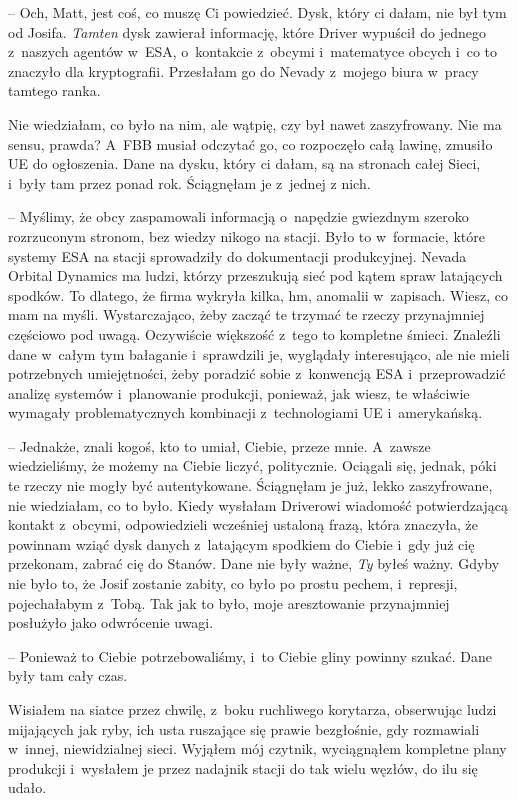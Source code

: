 \documentclass[oneside,polish,12pt,sfheadings]{mwbk}
\begin{document}
-- Och, Matt, jest coś, co muszę Ci powiedzieć. Dysk, który ci dałam, nie
był tym od Josifa. \emph{Tamten} dysk zawierał informację, które Driver
wypuścił do jednego z~naszych agentów w~ESA, o~kontakcie z~obcymi i~matematyce obcych i~co to znaczyło dla kryptografii. Przesłałam go do
Nevady z~mojego biura w~pracy tamtego ranka.

Nie wiedziałam, co było na nim, ale wątpię, czy był nawet zaszyfrowany.
Nie ma sensu, prawda? A~FBB musiał odczytać go, co rozpoczęło całą
lawinę, zmusiło UE do ogłoszenia. Dane na dysku, który ci dałam, są na
stronach całej Sieci, i~były tam przez ponad rok. Ściągnęłam je z~jednej
z nich.

-- Myślimy, że obcy zaspamowali informacją o~napędzie gwiezdnym szeroko
rozrzuconym stronom, bez wiedzy nikogo na stacji. Było to w~formacie,
które systemy ESA na stacji sprowadziły do dokumentacji produkcyjnej.
Nevada Orbital Dynamics ma ludzi, którzy przeszukują sieć pod kątem
spraw latających spodków. To dlatego, że firma wykryła kilka, hm,
anomalii w~zapisach. Wiesz, co mam na myśli. Wystarczająco, żeby zacząć
te trzymać te rzeczy przynajmniej częściowo pod uwagą. Oczywiście
większość z~tego to kompletne śmieci. Znaleźli dane w~całym tym
bałaganie i~sprawdzili je, wyglądały interesująco, ale nie mieli
potrzebnych umiejętności, żeby poradzić sobie z~konwencją ESA i~przeprowadzić analizę systemów i~planowanie produkcji, ponieważ, jak
wiesz, te właściwie wymagały problematycznych kombinacji z~technologiami
UE i~amerykańską.

-- Jednakże, znali kogoś, kto to umiał, Ciebie, przeze mnie. A~zawsze
wiedzieliśmy, że możemy na Ciebie liczyć, politycznie. Ociągali się,
jednak, póki te rzeczy nie mogły być autentykowane. Ściągnęłam je już,
lekko zaszyfrowane, nie wiedziałam, co to było. Kiedy wysłałam Driverowi
wiadomość potwierdzającą kontakt z~obcymi, odpowiedzieli wcześniej
ustaloną frazą, która znaczyła, że powinnam wziąć dysk danych z~latającym spodkiem do Ciebie i~gdy już cię przekonam, zabrać cię do
Stanów. Dane nie były ważne, \emph{Ty} byłeś ważny. Gdyby nie było to,
że Josif zostanie zabity, co było po prostu pechem, i~represji,
pojechałabym z~Tobą. Tak jak to było, moje aresztowanie przynajmniej
posłużyło jako odwrócenie uwagi.

-- Ponieważ to Ciebie potrzebowaliśmy, i~to Ciebie gliny powinny szukać.
Dane były tam cały czas.

Wisiałem na siatce przez chwilę, z~boku ruchliwego korytarza, obserwując
ludzi mijających jak ryby, ich usta ruszające się prawie bezgłośnie, gdy
rozmawiali w~innej, niewidzialnej sieci. Wyjąłem mój czytnik,
wyciągnąłem kompletne plany produkcji i~wysłałem je przez nadajnik
stacji do tak wielu węzłów, do ilu się udało.
\end{document}
